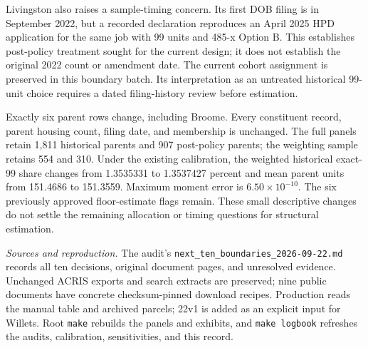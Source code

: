 Livingston also raises a sample-timing concern. Its first DOB filing is in
September 2022, but a recorded declaration reproduces an April 2025 HPD
application for the same job with 99 units and 485-x Option B. This establishes
post-policy treatment sought for the current design; it does not establish the
original 2022 count or amendment date. The current cohort assignment is preserved
in this boundary batch. Its interpretation as an untreated historical 99-unit
choice requires a dated filing-history review before estimation.

Exactly six parent rows change, including Broome. Every constituent record,
parent housing count, filing date, and membership is unchanged. The full panels
retain 1,811 historical parents and 907 post-policy parents; the weighting
sample retains 554 and 310. Under the existing calibration, the weighted
historical exact-99 share changes from 1.3535331 to 1.3537427 percent and mean
parent units from 151.4686 to 151.3559. Maximum moment error is
$6.50\times10^{-10}$. The six previously approved floor-estimate flags remain.
These small descriptive changes do not settle the remaining allocation or
timing questions for structural estimation.

\textit{Sources and reproduction.} The audit's
\texttt{next\_ten\_boundaries\_2026-09-22.md} records all ten decisions, original
document pages, and unresolved evidence. Unchanged ACRIS exports and search
extracts are preserved; nine public documents have concrete checksum-pinned
download recipes. Production reads the manual table and archived parcels;
22v1 is added as an explicit input for Willets. Root \texttt{make} rebuilds
the panels and exhibits, and \texttt{make logbook} refreshes the audits,
calibration, sensitivities, and this record.
